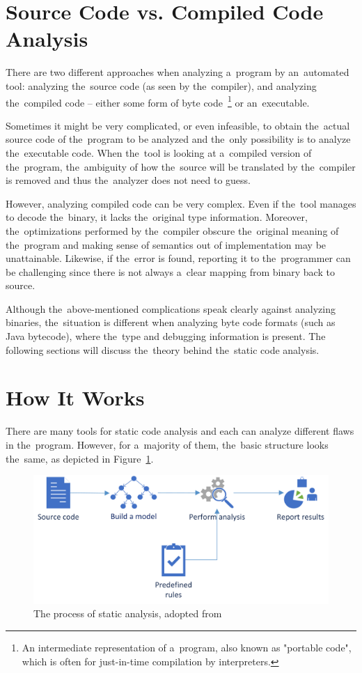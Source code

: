 \documentclass[
  digital, %
  table,   %
  lof,     %
  lot,     %
  oneside,
]{fithesis3}
\begin{document}
\section{Source Code vs. Compiled Code Analysis}
There are two different approaches when analyzing a~program by an~automated tool: analyzing the~source code (as seen by the~compiler), and analyzing the~compiled code -- either some form of byte code~\footnote{An intermediate representation of a~program, also known as "portable code", which is often for just-in-time compilation by interpreters.} or an~executable.

Sometimes it might be very complicated, or even infeasible, to obtain the~actual source code of the~program to be analyzed and the~only possibility is to analyze the~executable code. When the~tool is looking at a~compiled version of the~program, the~ambiguity of how the~source will be translated by the~compiler is removed and thus the~analyzer does not need to guess. 

However, analyzing compiled code can be very complex. Even if the~tool manages to decode the~binary, it lacks the~original type information. Moreover, the~optimizations performed by the~compiler obscure the~original meaning of the~program and making sense of semantics out of implementation may be unattainable. Likewise, if the~error is found, reporting it to the~programmer can be challenging since there is not always a~clear mapping from binary back to source. 

Although the~above-mentioned complications speak clearly against analyzing binaries, the~situation is different when analyzing byte code formats (such as Java bytecode), where the~type and debugging information is present. The following sections will discuss the~theory behind the~static code analysis.

\section{How It Works}
There are many tools for static code analysis and each can analyze different flaws in the~program. However, for a~majority of them, the~basic structure looks the~same, as depicted in Figure~\ref{fig:static-code-analysis-internals}.

\begin{figure}[h!]
		\centering
			\includegraphics[scale=0.90]{img/static-code-analysis-internals}
		\caption{The process of static analysis, adopted from~\cite{secure-programming-sca}}
		\label{fig:static-code-analysis-internals}
\end{figure}
\end{document}
